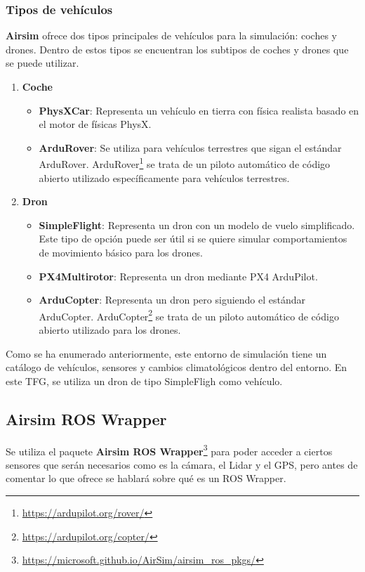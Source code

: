 \subsubsection{Tipos de vehículos}
\label{sec:airsim}
\textbf{Airsim} ofrece dos tipos principales de vehículos para la simulación: coches y drones. Dentro de estos tipos se encuentran los subtipos de coches y drones que se puede utilizar.
\begin{enumerate}
  \item \textbf{Coche}
    \begin{itemize}
      \item \textbf{PhysXCar}: Representa un vehículo en tierra con física realista basado en el motor de físicas PhysX.
      \item \textbf{ArduRover}: Se utiliza para vehículos terrestres que sigan el estándar ArduRover. ArduRover\footnote{\url{https://ardupilot.org/rover/}} 
      se trata de un piloto automático de código abierto utilizado específicamente para vehículos terrestres.
    \end{itemize}
  \item \textbf{Dron}
    \begin{itemize}
      \item \textbf{SimpleFlight}: Representa un dron con un modelo de vuelo simplificado. Este tipo de opción puede ser útil si se quiere simular comportamientos 
      de movimiento básico para los drones.
      \item \textbf{PX4Multirotor}: Representa un dron mediante PX4 ArduPilot. 
      \item \textbf{ArduCopter}: Representa un dron pero siguiendo el estándar ArduCopter. ArduCopter\footnote{\url{https://ardupilot.org/copter/}} 
      se trata de un piloto automático de código abierto utilizado para los drones. 
    \end{itemize}
  
\end{enumerate}

Como se ha  enumerado anteriormente, este entorno de simulación tiene un catálogo de vehículos, sensores y
cambios climatológicos dentro del entorno. En este TFG, se utiliza un dron de tipo SimpleFligh como vehículo. 

\subsection{Airsim ROS Wrapper}
\label{sec:wrapper}
Se utiliza el paquete \textbf{Airsim ROS Wrapper}\footnote{\url{https://microsoft.github.io/AirSim/airsim_ros_pkgs/}} para poder acceder a ciertos sensores 
que serán necesarios como es la cámara, el Lidar y el GPS, pero antes de comentar lo que ofrece se hablará sobre qué es un ROS Wrapper. 


